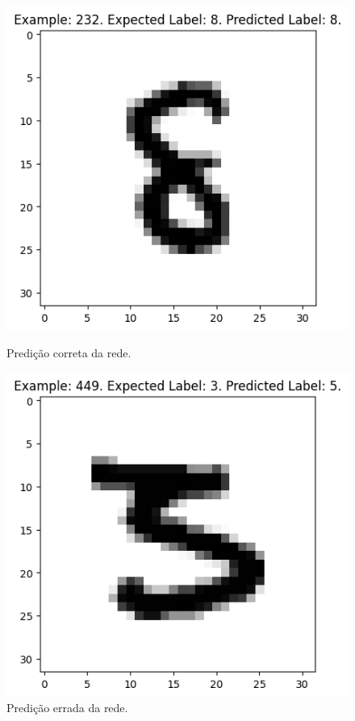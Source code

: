 \documentclass[a4paper,12pt]{article}
\begin{document}
\begin{figure}[htbp]
    \centering
    \begin{minipage}{0.45\textwidth}
        \centering
        \includegraphics[width=\textwidth]{predicaocerta.png}
        \caption{Predição correta da rede.}
        \label{fig:imagem1}
    \end{minipage}\hfill
    \begin{minipage}{0.45\textwidth}
        \centering
        \includegraphics[width=\textwidth]{predicaoerrada.png}
        \caption{Predição errada da rede.}
        \label{fig:imagem2}
    \end{minipage}
\end{figure}
\end{document}
